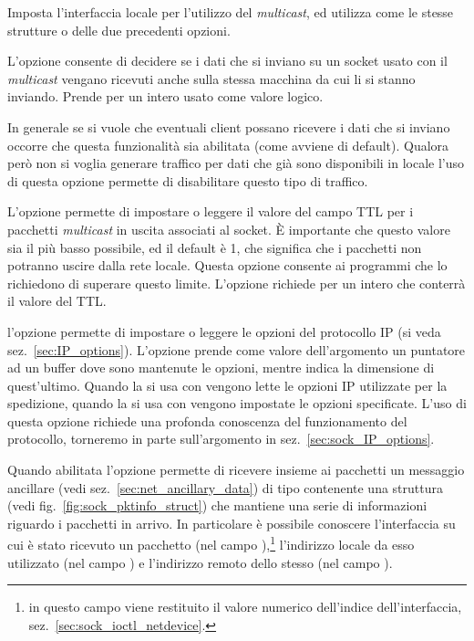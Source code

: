 \begin{basedescript}{\desclabelwidth{2.0cm}\desclabelstyle{\nextlinelabel}}
\item[\constd{IP\_MULTICAST\_IF}] Imposta l'interfaccia locale per l'utilizzo
  del \textit{multicast}, ed utilizza come  le stesse strutture
   o  delle due precedenti opzioni.

\item[\constd{IP\_MULTICAST\_LOOP}] L'opzione consente di decidere se i dati
  che si inviano su un socket usato con il \textit{multicast} vengano ricevuti
  anche sulla stessa macchina da cui li si stanno inviando.  Prende per
   un intero usato come valore logico.

  In generale se si vuole che eventuali client possano ricevere i dati che si
  inviano occorre che questa funzionalità sia abilitata (come avviene di
  default). Qualora però non si voglia generare traffico per dati che già sono
  disponibili in locale l'uso di questa opzione permette di disabilitare
  questo tipo di traffico.

\item[\constd{IP\_MULTICAST\_TTL}] L'opzione permette di impostare o leggere il
  valore del campo TTL per i pacchetti \textit{multicast} in uscita associati
  al socket. È importante che questo valore sia il più basso possibile, ed il
  default è 1, che significa che i pacchetti non potranno uscire dalla rete
  locale. Questa opzione consente ai programmi che lo richiedono di superare
  questo limite.  L'opzione richiede per
   un intero che conterrà il valore del TTL.

\item[\constd{IP\_OPTIONS}] l'opzione permette di impostare o leggere le
  opzioni del protocollo IP (si veda sez.~\ref{sec:IP_options}). L'opzione
  prende come valore dell'argomento  un puntatore ad un buffer
  dove sono mantenute le opzioni, mentre  indica la dimensione
  di quest'ultimo. Quando la si usa con  vengono lette le
  opzioni IP utilizzate per la spedizione, quando la si usa con
   vengono impostate le opzioni specificate. L'uso di questa
  opzione richiede una profonda conoscenza del funzionamento del protocollo,
  torneremo in parte sull'argomento in sez.~\ref{sec:sock_IP_options}.

\item[\constd{IP\_PKTINFO}] Quando abilitata l'opzione permette di ricevere
  insieme ai pacchetti un messaggio ancillare (vedi
  sez.~\ref{sec:net_ancillary_data}) di tipo  contenente
  una struttura  (vedi fig.~\ref{fig:sock_pktinfo_struct}) che
  mantiene una serie di informazioni riguardo i pacchetti in arrivo. In
  particolare è possibile conoscere l'interfaccia su cui è stato ricevuto un
  pacchetto (nel campo ),\footnote{in questo campo viene
    restituito il valore numerico dell'indice dell'interfaccia,
    sez.~\ref{sec:sock_ioctl_netdevice}.} l'indirizzo locale da esso
  utilizzato (nel campo ) e l'indirizzo remoto dello
  stesso (nel campo ).


\end{basedescript}
